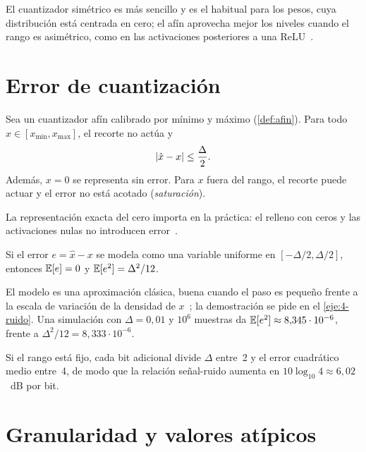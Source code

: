 El cuantizador simétrico es más sencillo y es el habitual para los pesos, cuya distribución está centrada en cero; el afín aprovecha mejor los niveles cuando el rango es asimétrico, como en las activaciones posteriores a una ReLU~\cite{mit65940}.

\addtocounter{figure}{1}%

\section{Error de cuantización}

\begin{teorema}\label{teo:error-cuant}
Sea un cuantizador afín calibrado por mínimo y máximo (\cref{def:afin}). Para todo $x\in[x_{\min},x_{\max}]$, el recorte no actúa y
\[
\lvert\hat x-x\rvert\le\frac{\Delta}{2}.
\]
Además, $x=0$ se representa sin error. Para $x$ fuera del rango, el recorte puede actuar y el error no está acotado (\emph{saturación}).
\end{teorema}

La representación exacta del cero importa en la práctica: el relleno con ceros y las activaciones nulas no introducen error~\cite{jacob}.

\addtocounter{definicion}{1}%

\begin{proposicion}\label{prop:ruido}
Si el error $e=\hat x-x$ se modela como una variable uniforme en $[-\Delta/2,\Delta/2]$, entonces $\mathbb{E}[e]=0$ y $\mathbb{E}[e^{2}]=\Delta^{2}/12$.
\end{proposicion}

El modelo es una aproximación clásica, buena cuando el paso es pequeño frente a la escala de variación de la densidad de $x$~\cite{grayneuhoff}; la demostración se pide en el \cref{eje:4-ruido}. Una simulación con $\Delta=0{,}01$ y $10^{6}$ muestras da $\mathbb{E}[e^{2}]\approx 8{,}345\cdot 10^{-6}$, frente a $\Delta^{2}/12=8{,}333\cdot 10^{-6}$.

\begin{corolario}\label{cor:6db}
Si el rango está fijo, cada bit adicional divide $\Delta$ entre~2 y el error cuadrático medio entre~4, de modo que la relación señal-ruido aumenta en $10\log_{10}4\approx 6{,}02$~dB por bit.
\end{corolario}

\section{Granularidad y valores atípicos}

